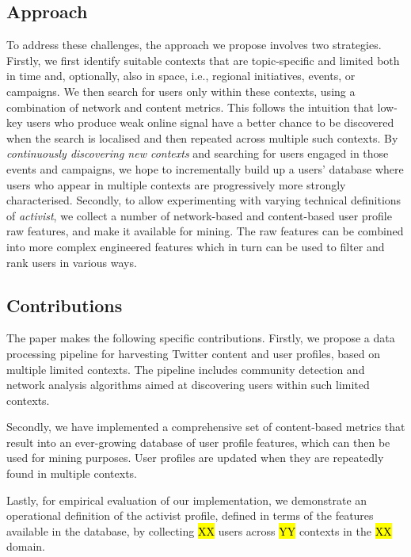 \documentclass[runningheads]{llncs}
\begin{document}
\subsection{Approach}

To address these challenges, the approach we propose involves two strategies. 
Firstly, we first identify suitable contexts that are topic-specific and limited both in time and, optionally, also in space, i.e., regional initiatives, events, or campaigns.
We then search for users only within these contexts, using a combination of network and content metrics. 
This follows the intuition that low-key users who produce weak online signal have a better chance to be discovered when the search is localised and then repeated across multiple such contexts.
By \textit{continuously discovering new contexts} and searching for users engaged in those events and campaigns, we hope to incrementally build up a users' database where users who appear in multiple contexts are progressively more strongly characterised.
%
Secondly, to allow experimenting with varying technical definitions of \textit{activist}, we collect a number of network-based and content-based  user profile raw features, and make it available for mining. The raw features can be combined into more complex engineered features which in turn can be used to filter and rank users in various ways.

\subsection{ Contributions}
The paper makes the following specific contributions.
%
Firstly, we propose a data processing pipeline for harvesting Twitter content and user profiles, based on multiple limited contexts. 
The pipeline includes community detection and network analysis algorithms aimed at discovering users within such limited contexts.

Secondly, we have implemented a comprehensive set of content-based metrics that result into an ever-growing database of user profile features, which can then be used for mining purposes. 
User profiles are updated when they are repeatedly found in multiple contexts.

Lastly, for empirical evaluation of our implementation, we demonstrate an operational definition of the activist profile, defined in terms of the features available in the database, by collecting \hl{XX} users across \hl{YY} contexts in the \hl{XX} domain. 
\end{document}

